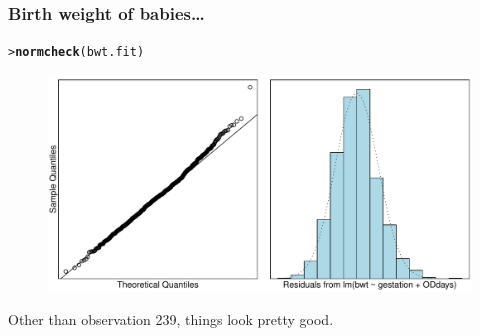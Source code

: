 \documentclass{beamer}\usepackage[]{graphicx}\usepackage[]{xcolor}
\makeatletter
\newcommand{\hlstd}[1]{\textcolor[rgb]{0.345,0.345,0.345}{#1}}%
\newcommand{\hlkwd}[1]{\textcolor[rgb]{0.737,0.353,0.396}{\textbf{#1}}}%
\newenvironment{kframe}{%
 \def\at@end@of@kframe{}%
 \ifinner\ifhmode%
  \def\at@end@of@kframe{\end{minipage}}%
  \begin{minipage}{\columnwidth}%
 \fi\fi%
 \def\FrameCommand##1{\hskip\@totalleftmargin \hskip-\fboxsep
 \colorbox{shadecolor}{##1}\hskip-\fboxsep
     \hskip-\linewidth \hskip-\@totalleftmargin \hskip\columnwidth}%
 \MakeFramed {\advance\hsize-\width
   \@totalleftmargin\z@ \linewidth\hsize
   \@setminipage}}%
 {\par\unskip\endMakeFramed%
 \at@end@of@kframe}
\newenvironment{knitrout}{}{} %
\makeatother
\begin{document}
\begin{frame}[fragile]
\frametitle{Birth weight of babies\ldots}
\begin{knitrout}\scriptsize
{}\color{fgcolor}\begin{kframe}
\begin{alltt}
\hlstd{> }\hlkwd{normcheck}\hlstd{(bwt.fit)}
\end{alltt}
\end{kframe}
\end{knitrout}



\begin{figure}
  \centering
  \includegraphics[scale = 0.5]{figure/RC-H10-022}
\end{figure}

Other than observation 239, things look pretty good.
\end{frame}
\end{document}

